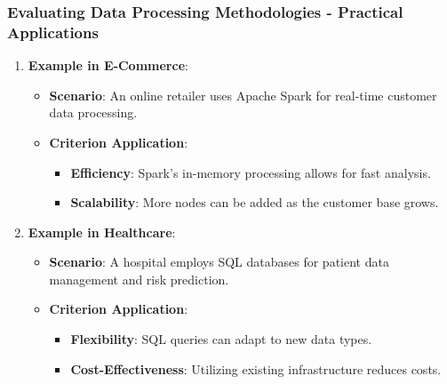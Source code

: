 \documentclass[aspectratio=169]{beamer}
\begin{document}
\begin{frame}[fragile]
    \frametitle{Evaluating Data Processing Methodologies - Practical Applications}
    \begin{enumerate}
        \item \textbf{Example in E-Commerce}:
        \begin{itemize}
            \item \textbf{Scenario}: An online retailer uses Apache Spark for real-time customer data processing.
            \item \textbf{Criterion Application}:
            \begin{itemize}
                \item \textbf{Efficiency}: Spark's in-memory processing allows for fast analysis.
                \item \textbf{Scalability}: More nodes can be added as the customer base grows.
            \end{itemize}
        \end{itemize}
        
        \item \textbf{Example in Healthcare}:
        \begin{itemize}
            \item \textbf{Scenario}: A hospital employs SQL databases for patient data management and risk prediction.
            \item \textbf{Criterion Application}:
            \begin{itemize}
                \item \textbf{Flexibility}: SQL queries can adapt to new data types.
                \item \textbf{Cost-Effectiveness}: Utilizing existing infrastructure reduces costs.
            \end{itemize}
        \end{itemize}
    \end{enumerate}
\end{frame}
\end{document}
